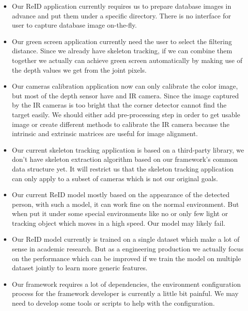 \begin{itemize}
	\item Our ReID application currently requires us to prepare database images
	in advance and put them under a specific directory. There is no interface
	for user to capture database image on-the-fly.

	\item Our green screen application currently need the user to select the
	filtering distance. Since we already have skeleton tracking, if we can
	combine them together we actually can achieve green screen automatically by
	making use of the depth values we get from the joint pixels.

	\item Our cameras calibration application now can only calibrate the color
	image, but most of the depth sensor have and IR camera. Since the image
	captured by the IR cameras is too bright that the corner detector cannot
	find the target easily. We should either add pre-processing step in order
	to get usable image or create different methods to calibrate the IR camera
	because the intrinsic and extrinsic matrices are useful for image alignment.

	\item Our current skeleton tracking application is based on a third-party
	library, we don't have skeleton extraction algorithm based on our
	framework's common data structure yet. It will restrict us that the
	skeleton tracking application can only apply to a subset of cameras which
	is not our original goals.

	\item Our current ReID model mostly based on the appearance of the detected
	person, with such a model, it can work fine on the normal environment. But
	when put it under some special environments like no or only few light or
	tracking object which moves in a high speed. Our model may likely fail.

	\item Our ReID model currently is trained on a single dataset which make a
	lot of sense in academic research. But as a engineering production we
	actually focus on the performance which can be improved if we train the
	model on multiple dataset jointly to learn more generic features.

	\item Our framework requires a lot of dependencies, the environment
	configuration process for the framework developer is currently a little bit
	painful. We may need to develop some tools or scripts to help with the
	configuration.
\end{itemize}

